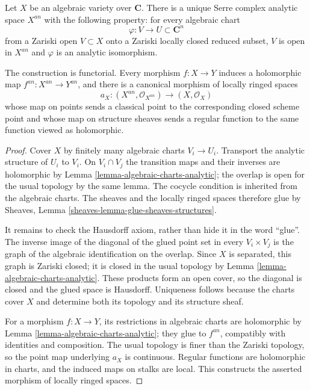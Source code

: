 \begin{proposition}
\label{proposition-analytification}
Let $X$ be an algebraic variety over $\mathbf C$. There is a unique Serre
complex analytic space $X^{an}$ with the following property: for every
algebraic chart
$$
\varphi : V \longrightarrow U \subset \mathbf C^n
$$
from a Zariski open $V \subset X$ onto a Zariski locally closed reduced
subset, $V$ is open in $X^{an}$ and $\varphi$ is an analytic isomorphism.

The construction is functorial. Every morphism $f : X \to Y$ induces a
holomorphic map $f^{an} : X^{an} \to Y^{an}$, and there is a canonical
morphism of locally ringed spaces
$$
a_X : (X^{an}, \mathcal O_{X^{an}}) \longrightarrow
(X, \mathcal O_X)
$$
whose map on points sends a classical point to the corresponding closed
scheme point and whose map on structure sheaves sends a regular function to
the same function viewed as holomorphic.
\end{proposition}

\begin{proof}
Cover $X$ by finitely many algebraic charts $V_i \to U_i$. Transport the
analytic structure of $U_i$ to $V_i$. On $V_i \cap V_j$ the transition maps
and their inverses are holomorphic by
Lemma \ref{lemma-algebraic-charts-analytic}; the overlap is open for the usual
topology by the same lemma. The cocycle condition is inherited from the
algebraic charts. The sheaves and the locally ringed spaces therefore glue by
Sheaves, Lemma \ref{sheaves-lemma-glue-sheaves-structures}.

It remains to check the Hausdorff axiom, rather than hide it in the word
``glue''. The inverse image of the diagonal of the glued point set in every
$V_i \times V_j$ is the graph of the algebraic identification on the overlap.
Since $X$ is separated, this graph is Zariski closed; it is closed in the usual
topology by Lemma \ref{lemma-algebraic-charts-analytic}. These products form an
open cover, so the diagonal is closed and the glued space is Hausdorff.
Uniqueness follows because the charts cover $X$ and determine both its topology
and its structure sheaf.

For a morphism $f : X \to Y$, its restrictions in algebraic charts are
holomorphic by Lemma \ref{lemma-algebraic-charts-analytic}; they glue to
$f^{an}$, compatibly with identities and composition. The usual topology is
finer than the Zariski topology, so the point map underlying $a_X$ is
continuous. Regular functions are holomorphic in charts, and the induced maps
on stalks are local. This constructs the asserted morphism of locally ringed
spaces.
\end{proof}


